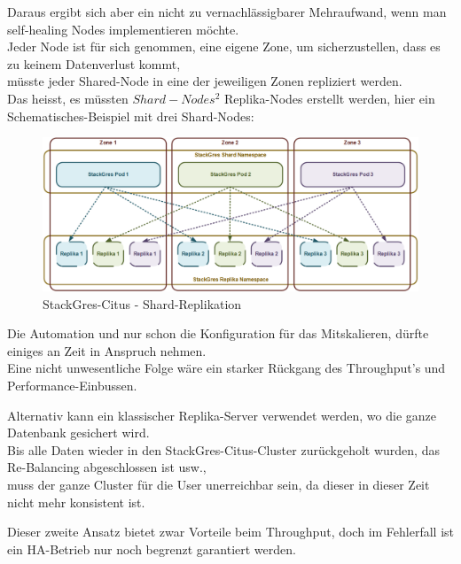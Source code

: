 \begin{flushleft}
\begin{flushleft}
\begin{flushleft}
            Daraus ergibt sich aber ein nicht zu vernachlässigbarer Mehraufwand, wenn man self-healing Nodes implementieren möchte.\\
            Jeder Node ist für sich genommen, eine eigene Zone, um sicherzustellen, dass es zu keinem Datenverlust kommt,\\
            müsste jeder Shared-Node in eine der jeweiligen Zonen repliziert werden.\\
            Das heisst, es müssten \(Shard-Nodes^2 \) Replika-Nodes erstellt werden, hier ein Schematisches-Beispiel mit drei Shard-Nodes:
            \begin{figure}[H]
                \centering
                \includegraphics[width=0.8\linewidth]{source/implementation/evaluation/postgresql_ha_solutions/stackgres/stackgres_shard_replication}
                \caption{StackGres-Citus - Shard-Replikation}
                \label{fig:stackgres_shard_replication}
            \end{figure}
            Die Automation und nur schon die Konfiguration für das Mitskalieren, dürfte einiges an Zeit in Anspruch nehmen.\\
            Eine nicht unwesentliche Folge wäre ein starker Rückgang des Throughput's und Performance-Einbussen.
        \end{flushleft}
        \begin{flushleft}
            Alternativ kann ein klassischer Replika-Server verwendet werden, wo die ganze Datenbank gesichert wird.\\
            Bis alle Daten wieder in den StackGres-Citus-Cluster zurückgeholt wurden, das Re-Balancing abgeschlossen ist usw.,\\
            muss der ganze Cluster für die User unerreichbar sein, da dieser in dieser Zeit nicht mehr konsistent ist.
        \end{flushleft}
        \begin{flushleft}
            Dieser zweite Ansatz bietet zwar Vorteile beim Throughput, doch im Fehlerfall ist ein HA-Betrieb nur noch begrenzt garantiert werden.
        \end{flushleft}
    \end{flushleft}
\end{flushleft}
